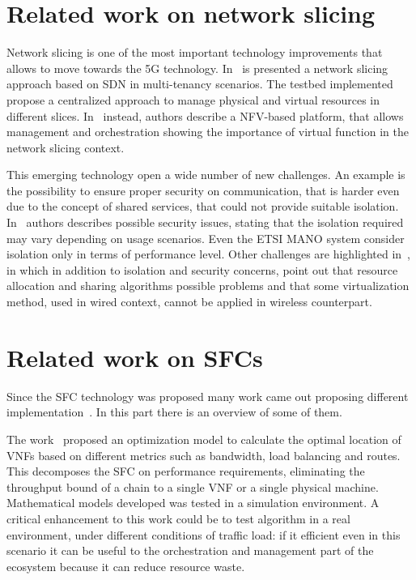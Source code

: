 \section{Related work on network slicing}
Network slicing is one of the most important technology improvements that allows
to move towards the 5G technology. In~\cite{chartsias2017sdn} is presented a
network slicing approach based on SDN in multi-tenancy scenarios. The testbed
implemented propose a centralized approach to manage physical and virtual
resources in different slices. In~\cite{peuster2016medicine} instead, authors
describe a NFV-based platform, that allows management and orchestration showing
the importance of virtual function in the network slicing context.

This emerging technology open a wide number of new challenges. An example is the
possibility to ensure proper security on communication, that is harder even due
to the concept of shared services, that could not provide suitable isolation. 
In~\cite{kotulski2017end} authors describes possible security issues, stating
that the isolation required may vary depending on usage scenarios. Even the ETSI
MANO system consider isolation only in terms of performance level. Other
challenges are highlighted in~\cite{li2017network}, in which in addition to
isolation and security concerns, point out that resource allocation and
sharing algorithms possible problems and that some virtualization method, used
in wired context, cannot be applied in wireless counterpart.

\section{Related work on SFCs}

Since the SFC technology was proposed many work came out proposing different
implementation~\cite{medhat2017service}. In this part there is an overview of
some of them.

The work~\cite{GhaznaviSAB16} proposed an optimization model to calculate the
optimal location of VNFs based on different metrics such as bandwidth, load
balancing and routes. This decomposes the SFC on performance requirements,
eliminating the throughput bound of a chain to a single VNF or a single physical
machine. Mathematical models developed was tested in a simulation environment. A
critical enhancement to this work could be to test algorithm in a real
environment, under different conditions of traffic load: if it efficient even in
this scenario it can be useful to the orchestration and management part of the
ecosystem because it can reduce resource waste.

